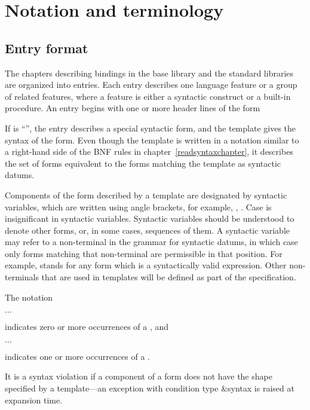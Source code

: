 \chapter{Notation and terminology}
\label{terminologychapter}

\section{Entry format}

The chapters describing bindings in the base library and the standard
libraries are organized
into entries.  Each entry describes one language feature or a group of
related features, where a feature is either a syntactic construct or a
built-in procedure.  An entry begins with one or more header lines of the form

\noindent{}\unpenalty

If  is ``\exprtype'', the entry describes a 
special syntactic form, and the template gives the syntax of the form.  Even
though the template is written in a notation similar to a right-hand
side of the BNF rules in chapter~\ref{readsyntaxchapter}, it describes
the set of forms equivalent to the forms matching the
template as syntactic datums.

Components of the form described by a template are designated
by syntactic variables, which are written using angle brackets, for
example, , .  Case is insignificant
in syntactic variables.  Syntactic variables
should be understood to denote other forms, or, in some cases,
sequences of them.  A syntactic variable may refer to a non-terminal
in the grammar for syntactic datums, in which case only forms matching
that non-terminal are permissible in that position.  For example,
 stands for any form which is a
syntactically valid expression.  Other non-terminals that are used in
templates will be defined as part of the specification.

The notation
\begin{tabbing}
\qquad {} $\ldots$
\end{tabbing}
indicates zero or more occurrences of a , and
\begin{tabbing}
\qquad {}  $\ldots$
\end{tabbing}
indicates one or more occurrences of a .

It is a syntax violation if a component of a form does not have the
shape specified by a template---an exception with condition type
{\cf\&syntax} is raised at expansion time.

